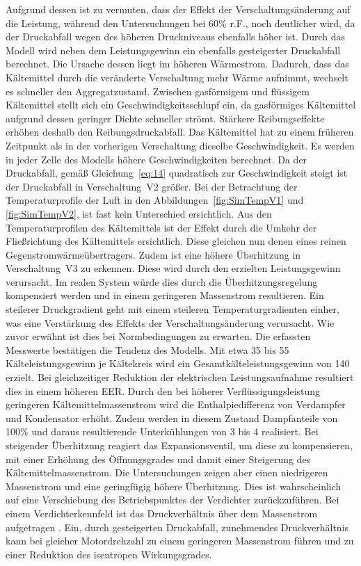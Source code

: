 Aufgrund dessen ist zu vermuten, dass der Effekt der Verschaltungsänderung auf die Leistung, während den Untersuchungen bei \unit{60}{\%} r.F., noch deutlicher wird, da der Druckabfall wegen des höheren Druckniveaus ebenfalls höher ist. Durch das Modell wird neben dem Leistungsgewinn ein ebenfalls gesteigerter Druckabfall berechnet. Die Ursache dessen liegt im höheren Wärmestrom. Dadurch, dass das Kältemittel durch die veränderte Verschaltung mehr Wärme aufnimmt, wechselt es schneller den Aggregatzustand. Zwischen gasförmigem und flüssigem Kältemittel stellt sich ein Geschwindigkeitsschlupf ein, da gasförmiges Kältemittel aufgrund dessen geringer Dichte schneller strömt. Stärkere Reibungseffekte erhöhen deshalb den Reibungsdruckabfall. Das Kältemittel hat zu einem früheren Zeitpunkt als in der vorherigen Verschaltung dieselbe Geschwindigkeit. Es werden in jeder Zelle des Modells höhere Geschwindigkeiten berechnet. Da der Druckabfall, gemäß Gleichung~\ref{eq:14} quadratisch zur Geschwindigkeit steigt ist der Druckabfall in Verschaltung~V2 größer. \newline
Bei der Betrachtung der Temperaturprofile der Luft in den Abbildungen~\ref{fig:SimTempV1} und \ref{fig:SimTempV2}, ist fast kein Unterschied ersichtlich. Aus den Temperaturprofilen des Kältemittels ist der Effekt durch die Umkehr der Fließrichtung des Kältemittels ersichtlich. Diese gleichen nun denen eines reinen Gegenstromwärmeübertragers. Zudem ist eine höhere Überhitzung in Verschaltung~V3 zu erkennen. Diese wird durch den erzielten Leistungsgewinn verursacht. Im realen System würde dies durch die Überhitzungsregelung kompensiert werden und in einem geringeren Massenstrom resultieren. Ein steilerer Druckgradient geht mit einem steileren Temperaturgradienten einher, was eine Verstärkung des Effekts der Verschaltungsänderung verursacht. Wie zuvor erwähnt ist dies bei Normbedingungen zu erwarten. \newline
Die erfassten Messwerte bestätigen die Tendenz des Modells. Mit etwa \unit{35}{\watt} bis \unit{55}{\watt} Kälteleistungsgewinn je Kältekreis wird ein Gesamtkälteleistungsgewinn von \unit{140}{\watt} erzielt. Bei gleichzeitiger Reduktion der elektrischen Leistungsaufnahme resultiert dies in einem höheren EER. Durch den bei höherer Verflüssigungsleistung geringeren Kältemittelmassenstrom wird die Enthalpiedifferenz von Verdampfer und Kondensator erhöht. Zudem werden in diesem Zustand Dampfanteile von \unit{100}{\%} und daraus resultierende Unterkühlungen von \unit{3}{\kelvin} bis \unit{4}{\kelvin} realisiert.
Bei steigender Überhitzung reagiert das Expansionsventil, um diese zu kompensieren, mit einer Erhöhung des Öffnungsgrades und damit einer Steigerung des Kältemittelmassenstrom. Die Untersuchungen zeigen aber einen niedrigeren Massenstrom und eine geringfügig höhere Überhitzung. Dies ist wahrscheinlich auf eine Verschiebung des Betriebspunktes der Verdichter zurückzuführen. Bei einem Verdichterkennfeld ist das Druckverhältnis über dem Massenstrom aufgetragen \cite{Wilke.2005}. Ein, durch gesteigerten Druckabfall, zunehmendes Druckverhältnis kann bei gleicher Motordrehzahl zu einem geringeren Massenstrom führen und zu einer Reduktion des isentropen Wirkungsgrades. \newline
